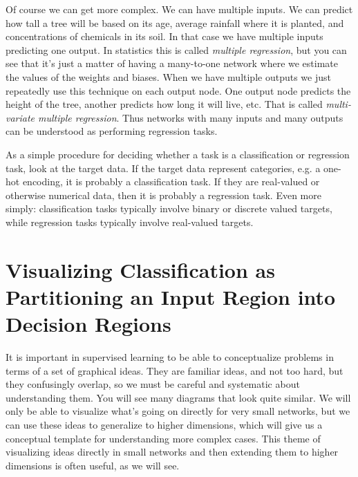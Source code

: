 Of course we can get more complex. We can have multiple inputs. We can  predict how tall a tree will be based on its age, average rainfall where it is planted, and concentrations of chemicals in its soil. In that case we have multiple inputs predicting one output. In statistics this is called \emph{multiple regression}, but you can see that it's just a matter of having  a many-to-one network where we estimate the values of the weights and biases. When we have multiple outputs we just repeatedly use this technique on each output node. One output node predicts the height of the tree, another predicts how long it will live, etc. That is called \emph{multi-variate multiple regression}. Thus networks with many inputs and many outputs can  be understood as performing regression tasks.

As a simple procedure for deciding whether a task is a classification or regression task, look at the target data. If the target data represent categories, e.g. a one-hot encoding, it is probably a classification task. If they are real-valued or otherwise numerical data, then it is probably a regression task. Even more simply: classification tasks typically involve binary or discrete valued targets, while regression tasks typically involve real-valued targets. 

\section{Visualizing Classification as Partitioning an Input Region into Decision Regions}
\label{visClassification}



It is important in supervised learning to be able to conceptualize problems in terms of a set of graphical ideas. They are familiar ideas, and not too hard, but they confusingly overlap, so we must be careful and systematic about understanding them. You will see many diagrams that look quite similar. We will only be able to visualize what's going on directly for very small networks, but we can use these ideas to generalize to higher dimensions, which will give us a conceptual template for understanding more complex cases. This theme of visualizing ideas directly in small networks and then extending them to higher dimensions is often useful, as we will see.

